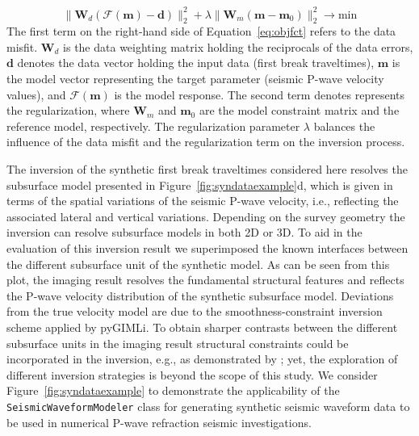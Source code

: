 \documentclass[a4paper,fleqn]{cas-sc}
\newcommand{\vecmat}[1]{\bm #1}
\begin{document}
\begin{equation}
	\parallel\vecmat{W}_d\left(\mathcal{F}\left(\vecmat{m}\right)-\vecmat{d}\right)\parallel_2^2+\lambda\parallel\vecmat{W}_m\left(\vecmat{m}-\vecmat{m}_0\right)\parallel_2^2\rightarrow\textrm{min}
	\label{eq:objfct}
\end{equation}
The first term on the right-hand side of Equation~\ref{eq:objfct} refers to the data misfit. $\vecmat{W}_d$ is the data weighting matrix holding the reciprocals of the data errors, $\vecmat{d}$ denotes the data vector holding the input data (first break traveltimes), $\vecmat{m}$ is the model vector representing the target parameter (seismic P-wave velocity values), and $\mathcal{F}\left(\vecmat{m}\right)$ is the model response.
The second term denotes represents the regularization, where $\vecmat{W}_m$ and $\vecmat{m}_0$ are the model constraint matrix and the reference model, respectively. The regularization parameter $\lambda$ balances the influence of the data misfit and the regularization term on the inversion process.

The inversion of the synthetic first break traveltimes considered here resolves the subsurface model presented in Figure~\ref{fig:syndataexample}d, which is given in terms of the spatial variations of the seismic P-wave velocity, i.e., reflecting the associated lateral and vertical variations. Depending on the survey geometry the inversion can resolve subsurface models in both 2D or 3D. 
To aid in the evaluation of this inversion result we superimposed the known interfaces between the different subsurface unit of the synthetic model. As can be seen from this plot, the imaging result resolves the fundamental structural features  and reflects the P-wave velocity distribution of the synthetic subsurface model. Deviations from the true velocity model are due to the smoothness-constraint inversion scheme applied by pyGIMLi. To obtain sharper contrasts between the different subsurface units in the imaging result structural constraints could be incorporated in the inversion, e.g., as demonstrated by \citep{steiner2021}; yet, the exploration of different inversion strategies is beyond the scope of this study. We consider Figure~\ref{fig:syndataexample} to demonstrate the applicability of the \texttt{SeismicWaveformModeler} class for generating synthetic seismic waveform data to be used in numerical P-wave refraction seismic investigations.
\end{document}
